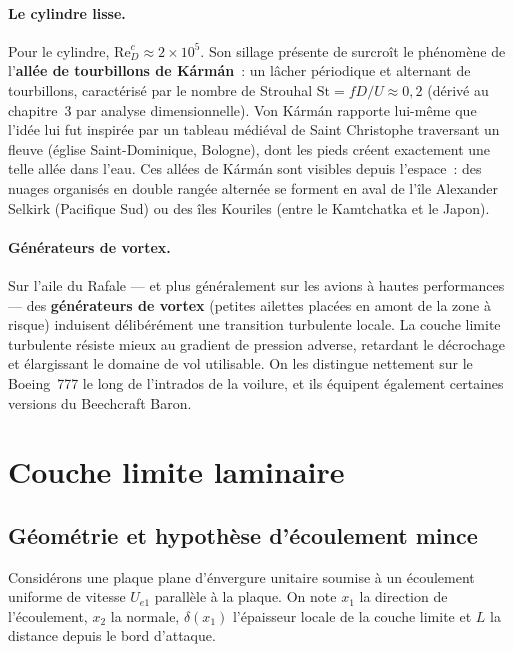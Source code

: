 \documentclass[11pt,a4paper]{report}
\begin{document}
\paragraph{Le cylindre lisse.}
Pour le cylindre, $\mathrm{Re}_D^c \approx 2\times10^5$. Son sillage pr\'esente de
surcro\^it le ph\'enom\`ene de l'\textbf{all\'ee de tourbillons de K\'arm\'an}~: un
l\^acher p\'eriodique et alternant de tourbillons, caract\'eris\'e par le nombre de
Strouhal $\mathrm{St} = fD/U \approx 0{,}2$ (d\'eriv\'e au chapitre~3 par analyse
dimensionnelle). Von K\'arm\'an rapporte lui-m\^eme que l'id\'ee lui fut inspir\'ee par
un tableau m\'edi\'eval de Saint Christophe traversant un fleuve (\'eglise
Saint-Dominique, Bologne), dont les pieds cr\'eent exactement une telle all\'ee dans
l'eau. Ces all\'ees de K\'arm\'an sont visibles depuis l'espace~: des nuages organis\'es
en double rang\'ee altern\'ee se forment en aval de l'\^ile Alexander Selkirk (Pacifique
Sud) ou des \^iles Kouriles (entre le Kamtchatka et le Japon).

\paragraph{G\'en\'erateurs de vortex.}
Sur l'aile du Rafale --- et plus g\'en\'eralement sur les avions \`a hautes performances
--- des \textbf{g\'en\'erateurs de vortex} (petites ailettes plac\'ees en amont de la
zone \`a risque) induisent d\'elib\'er\'ement une transition turbulente locale. La couche
limite turbulente r\'esiste mieux au gradient de pression adverse, retardant le d\'ecrochage
et \'elargissant le domaine de vol utilisable. On les distingue nettement sur le Boeing~777
le long de l'intrados de la voilure, et ils \'equipent \'egalement certaines versions
du Beechcraft Baron.

\section{Couche limite laminaire}

\subsection{G\'eom\'etrie et hypoth\`ese d'\'ecoulement mince}

Consid\'erons une plaque plane d'\'envergure unitaire soumise \`a un \'ecoulement uniforme
de vitesse $U_{e1}$ parall\`ele \`a la plaque. On note $x_1$ la direction de l'\'ecoulement,
$x_2$ la normale, $\delta(x_1)$ l'\'epaisseur locale de la couche limite et $L$ la
distance depuis le bord d'attaque.
\end{document}

